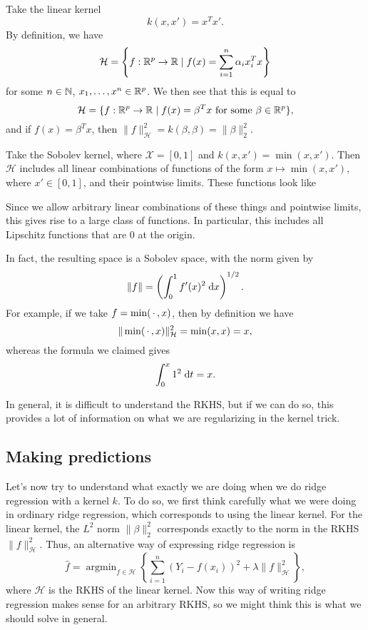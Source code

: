 \documentclass[a4paper]{article}
\DeclareMathOperator*\argmin{argmin}
\begin{document}
\begin{eg}
  Take the linear kernel
  \[
    k(x, x') = x^T x'.
  \]
  By definition, we have
  \[
    \mathcal{H} = \left\{f:\mathbb{R}^p \to \mathbb{R} \mid f(x) = \sum_{i = 1}^n \alpha_i x_i^T x\right\}
  \]
  for some $n \in \mathbb{N}$, $x_1, \ldots, x^n \in \mathbb{R}^p$. We then see that this is equal to
  \[
    \mathcal{H} = \{f: \mathbb{R}^p \to \mathbb{R} \mid f(x) = \beta^T x\text{ for some }\beta \in \mathbb{R}^p\},
  \]
  and if $f(x) = \beta^T x$, then $\|f\|_{\mathcal{H}}^2 = k(\beta, \beta) = \|\beta\|^2_2$.
\end{eg}

\begin{eg}
  Take the Sobolev kernel, where $\mathcal{X} = [0, 1]$ and $k(x, x') = \min(x, x')$. Then $\mathcal{H}$ includes all linear combinations of functions of the form $x \mapsto \min(x, x')$, where $x' \in [0, 1]$, and their pointwise limits. These functions look like
  \begin{center}
  \end{center}
  Since we allow arbitrary linear combinations of these things and pointwise limits, this gives rise to a large class of functions. In particular, this includes all Lipschitz functions that are $0$ at the origin.

  In fact, the resulting space is a Sobolev space, with the norm given by%
  \[
    \|f\| = \left(\int_0^1 f'(x)^2 \;\mathrm{d} x \right)^{1/2}.
  \]
  For example, if we take $f = \min (\,\cdot\,, x)$, then by definition we have
  \[
    \|\min(\,\cdot\,, x)\|_\mathcal{H}^2 = \min(x, x) = x,
  \]
  whereas the formula we claimed gives
  \[
    \int_0^x 1^2 \;\mathrm{d} t = x.
  \]
\end{eg}

In general, it is difficult to understand the RKHS, but if we can do so, this provides a lot of information on what we are regularizing in the kernel trick.

\subsection{Making predictions}
Let's now try to understand what exactly we are doing when we do ridge regression with a kernel $k$. To do so, we first think carefully what we were doing in ordinary ridge regression, which corresponds to using the linear kernel. For the linear kernel, the $L^2$ norm $\|\beta\|_2^2$ corresponds exactly to the norm in the RKHS $\|f\|_{\mathcal{H}}^2$. Thus, an alternative way of expressing ridge regression is
\[
  \hat{f} = \argmin_{f \in \mathcal{H}} \left\{\sum_{i = 1}^n (Y_i - f(x_i))^2 + \lambda \|f\|_{\mathcal{H}}^2 \right\},\tag{$*$}
\]
where $\mathcal{H}$ is the RKHS of the linear kernel. Now this way of writing ridge regression makes sense for an arbitrary RKHS, so we might think this is what we should solve in general.
\end{document}
